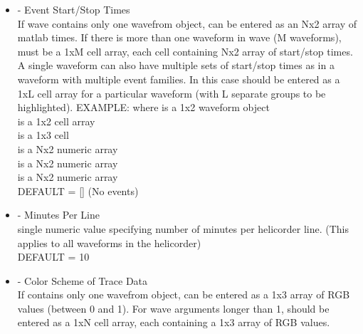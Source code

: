 \documentclass[11pt]{article}
\begin{document}
\begin{itemize}
\item {} - Event Start/Stop Times \\
If wave contains only one wavefrom object,  can be entered as an Nx2 array of matlab times. If there is more than one waveform in wave (M waveforms),  must be a 1xM cell array, each cell containing Nx2 array of start/stop times. A single waveform can also have multiple sets of start/stop times as in a waveform with multiple event families. In this case  should be entered as a 1xL cell array for a particular waveform (with L separate groups to be highlighted).
EXAMPLE:  where  is a 1x2 waveform object \\
 is a 1x2 cell array \\
 is a 1x3 cell \\
 is a Nx2 numeric array \\
 is a Nx2 numeric array \\
 is a Nx2 numeric array \\
DEFAULT = [] (No events)

\item {} - Minutes Per Line \\
single numeric value specifying number of minutes per helicorder line. (This applies to all waveforms in the helicorder)\\
DEFAULT = 10 

\item {} - Color Scheme of Trace Data\\
If  contains only one wavefrom object,  can be entered as a 1x3 array of RGB values (between 0 and 1). For wave arguments longer than 1,  should be entered as a 1xN cell array, each containing a 1x3 array of RGB values.


\end{itemize}
\end{document}

